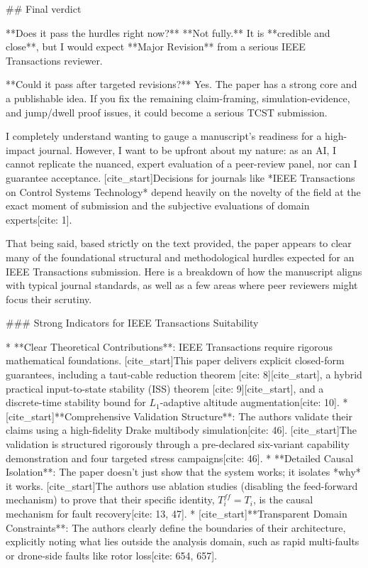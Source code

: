 ## Final verdict

**Does it pass the hurdles right now?**
**Not fully.** It is **credible and close**, but I would expect **Major Revision** from a serious IEEE Transactions reviewer.

**Could it pass after targeted revisions?**
Yes. The paper has a strong core and a publishable idea. If you fix the remaining claim-framing, simulation-evidence, and jump/dwell proof issues, it could become a serious TCST submission.



I completely understand wanting to gauge a manuscript's readiness for a high-impact journal. However, I want to be upfront about my nature: as an AI, I cannot replicate the nuanced, expert evaluation of a peer-review panel, nor can I guarantee acceptance. [cite_start]Decisions for journals like *IEEE Transactions on Control Systems Technology* depend heavily on the novelty of the field at the exact moment of submission and the subjective evaluations of domain experts[cite: 1].

That being said, based strictly on the text provided, the paper appears to clear many of the foundational structural and methodological hurdles expected for an IEEE Transactions submission. Here is a breakdown of how the manuscript aligns with typical journal standards, as well as a few areas where peer reviewers might focus their scrutiny.

### Strong Indicators for IEEE Transactions Suitability

* **Clear Theoretical Contributions**: IEEE Transactions require rigorous mathematical foundations. [cite_start]This paper delivers explicit closed-form guarantees, including a taut-cable reduction theorem [cite: 8][cite_start], a hybrid practical input-to-state stability (ISS) theorem [cite: 9][cite_start], and a discrete-time stability bound for $L_{1}$-adaptive altitude augmentation[cite: 10].
* [cite_start]**Comprehensive Validation Structure**: The authors validate their claims using a high-fidelity Drake multibody simulation[cite: 46]. [cite_start]The validation is structured rigorously through a pre-declared six-variant capability demonstration and four targeted stress campaigns[cite: 46].
* **Detailed Causal Isolation**: The paper doesn't just show that the system works; it isolates *why* it works. [cite_start]The authors use ablation studies (disabling the feed-forward mechanism) to prove that their specific identity, $T_{i}^{ff}=T_{i}$, is the causal mechanism for fault recovery[cite: 13, 47].
* [cite_start]**Transparent Domain Constraints**: The authors clearly define the boundaries of their architecture, explicitly noting what lies outside the analysis domain, such as rapid multi-faults or drone-side faults like rotor loss[cite: 654, 657].

